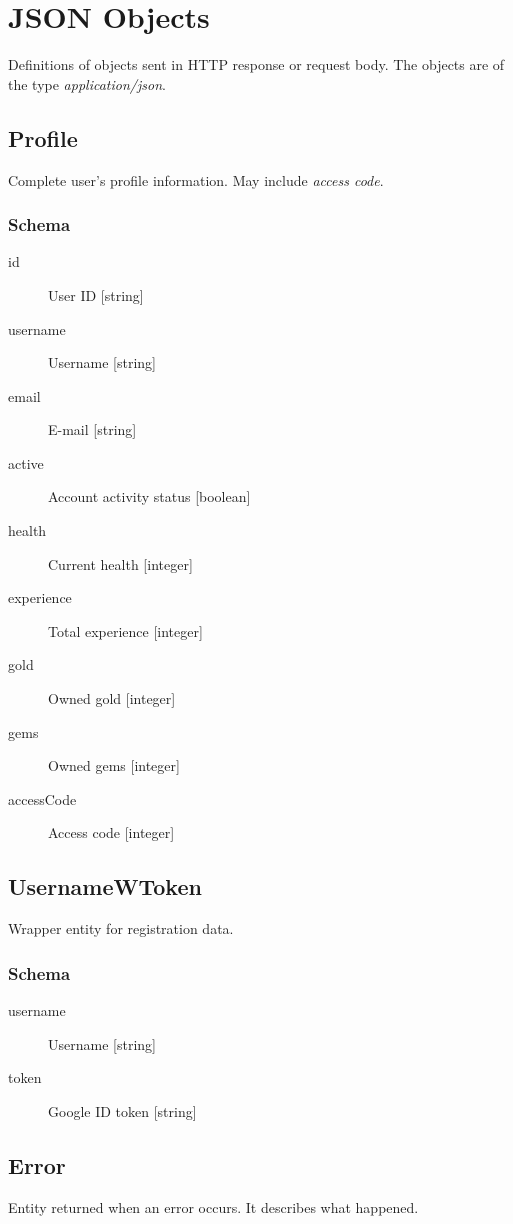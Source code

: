 \section{JSON Objects}
Definitions of objects sent in HTTP response or request body. The objects are of the type \textit{application/json}.
	\subsection{Profile}
		\label{json:profile}
		Complete user's profile information. May include \textit{access code}.
		\subsubsection{Schema}	
			\begin{description}
				\item[id] User ID [string]
				\item[username] Username [string]
				\item[email] E-mail [string]
				\item[active] Account activity status [boolean]
				\item[health] Current health [integer]
				\item[experience] Total experience [integer]
				\item[gold] Owned gold [integer]
				\item[gems] Owned gems [integer]
				\item[accessCode] Access code [integer]
			\end{description}

	\subsection{UsernameWToken}
		\label{json:usernamewtoken}
		Wrapper entity for registration data.
		\subsubsection{Schema}
			\begin{description}
				\item[username] Username [string]
				\item[token] Google ID token [string]
			\end{description}

	\subsection{Error}
		\label{json:error}
		Entity returned when an error occurs. It describes what happened.
